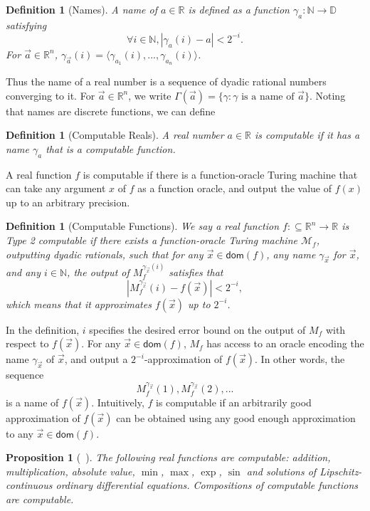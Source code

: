 \documentclass[10pt]{article}
\theoremstyle{plain}
\newtheorem{proposition}[theorem]{Proposition}
\newtheorem{definition}[theorem]{Definition}
\theoremstyle{definition}
\newcommand{\dom}{\mathsf{dom}}
\begin{document}
\begin{definition}[Names]
A name of $a\in \mathbb{R}$ is defined as a function $\mathcal{\gamma}_a: \mathbb{N}\rightarrow \mathbb{D}$ satisfying 
$$\forall i\in \mathbb{N}, |\gamma_a(i) - a|<2^{-i}.$$
For $\vec a\in \mathbb{R}^n$, $\gamma_{\vec a}(i) = \langle \gamma_{a_1}(i), ..., \gamma_{a_n}(i)\rangle$.  
\end{definition}
Thus the name of a real number is a sequence of dyadic rational numbers converging to it. For $\vec a\in \mathbb{R}^n$, we write $\Gamma(\vec a) = \{\gamma: \gamma\mbox{ is a name of }\vec a\}$. Noting that names are discrete functions, we can define
\begin{definition}[Computable Reals]
A real number $a\in \mathbb{R}$ is computable if it has a name $\gamma_{a}$ that is a computable function. 
\end{definition}

A real function $f$ is computable if there is a function-oracle Turing machine that can take any argument $x$ of $f$ as a function oracle, and output the value of $f(x)$ up to an arbitrary precision. 

\begin{definition}[Computable Functions]
We say a real function $f:\subseteq\mathbb{R}^n\rightarrow \mathbb{R}$ is Type 2 computable if there exists a function-oracle Turing machine $\mathcal{M}_f$, outputting dyadic rationals, such that for any $\vec x \in \dom(f)$, any name $\gamma_{\vec x}$ for $\vec x$, and any $i \in \mathbb{N}$, the output of $M_f^{\gamma_{\vec x}(i)}$ satisfies that  
$$|M_f^{\gamma_{\vec x}}(i) - f(\vec x)|<2^{-i},$$
which means that it approximates $f(\vec x)$ up to $2^{-i}$. 
\end{definition}

In the definition, $i$ specifies the desired error bound on the output of $M_f$ with respect to $f(\vec x)$. For any $\vec x\in \dom(f)$, $M_f$ has access to an oracle encoding the name $\gamma_{\vec x}$ of $\vec x$, and output a $2^{-i}$-approximation of $f(\vec x)$. In other words, the sequence 
$$M_f^{\gamma_{\vec x}}(1), M_f^{\gamma_{\vec x}}(2), ... $$
is a name of $f(\vec x)$. Intuitively, $f$ is computable if an arbitrarily good approximation of $f(\vec x)$ can be obtained using any good enough approximation to any $\vec x\in\dom(f)$.
\begin{proposition}[~\cite{CAbook}]
The following real functions are computable: addition, multiplication, absolute value, $\min$, $\max$, $\exp$, $\sin$ and solutions of Lipschitz-continuous ordinary differential equations. Compositions of computable functions are computable.  
\end{proposition}
\end{document}
